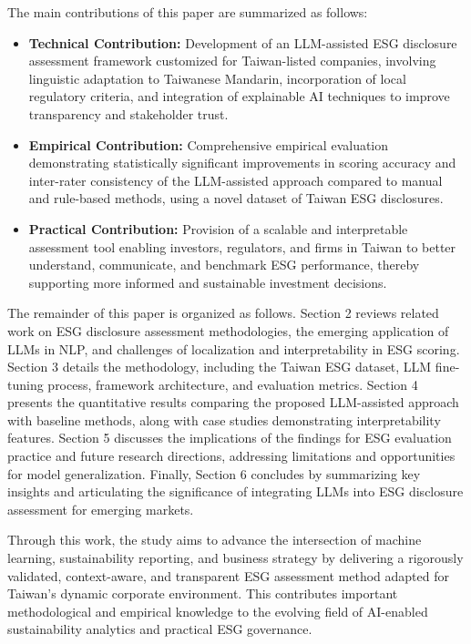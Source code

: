 \documentclass[
  12pt,
]{article}
\begin{document}
The main contributions of this paper are summarized as follows:

\begin{itemize}
\item
  \textbf{Technical Contribution:} Development of an LLM-assisted ESG
  disclosure assessment framework customized for Taiwan-listed
  companies, involving linguistic adaptation to Taiwanese Mandarin,
  incorporation of local regulatory criteria, and integration of
  explainable AI techniques to improve transparency and stakeholder
  trust.
\item
  \textbf{Empirical Contribution:} Comprehensive empirical evaluation
  demonstrating statistically significant improvements in scoring
  accuracy and inter-rater consistency of the LLM-assisted approach
  compared to manual and rule-based methods, using a novel dataset of
  Taiwan ESG disclosures.
\item
  \textbf{Practical Contribution:} Provision of a scalable and
  interpretable assessment tool enabling investors, regulators, and
  firms in Taiwan to better understand, communicate, and benchmark ESG
  performance, thereby supporting more informed and sustainable
  investment decisions.
\end{itemize}

The remainder of this paper is organized as follows. Section 2 reviews
related work on ESG disclosure assessment methodologies, the emerging
application of LLMs in NLP, and challenges of localization and
interpretability in ESG scoring. Section 3 details the methodology,
including the Taiwan ESG dataset, LLM fine-tuning process, framework
architecture, and evaluation metrics. Section 4 presents the
quantitative results comparing the proposed LLM-assisted approach with
baseline methods, along with case studies demonstrating interpretability
features. Section 5 discusses the implications of the findings for ESG
evaluation practice and future research directions, addressing
limitations and opportunities for model generalization. Finally, Section
6 concludes by summarizing key insights and articulating the
significance of integrating LLMs into ESG disclosure assessment for
emerging markets.

Through this work, the study aims to advance the intersection of machine
learning, sustainability reporting, and business strategy by delivering
a rigorously validated, context-aware, and transparent ESG assessment
method adapted for Taiwan's dynamic corporate environment. This
contributes important methodological and empirical knowledge to the
evolving field of AI-enabled sustainability analytics and practical ESG
governance.
\end{document}
